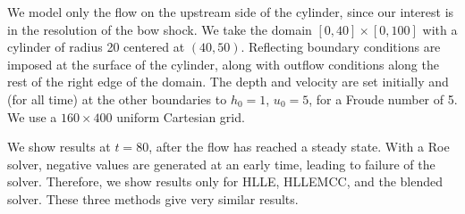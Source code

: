 \documentclass[preprint, 11pt]{article}
\begin{document}
We model only the flow on the upstream side of the cylinder, since
our interest is in the resolution of the bow shock.  We take the domain
$[0,40]\times[0,100]$ with a cylinder of radius 20 centered at $(40,50)$.
Reflecting boundary conditions are imposed at the surface of the cylinder,
along with outflow conditions along the rest of the right edge of the domain.
The depth and velocity are set initially and (for all time) at the other
boundaries to $h_0=1$, $u_0=5$, for a Froude number of 5.  We use a $160 \times 400$
uniform Cartesian grid.

We show results at $t=80$, after the flow has reached
a steady state.  With a Roe solver, negative values are generated at an early
time, leading to failure of the solver.  Therefore, we show results only for
HLLE, HLLEMCC, and the blended solver.  These three methods give very similar
results.
\end{document}
